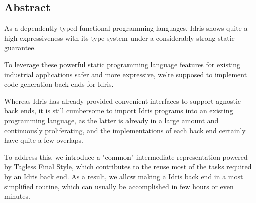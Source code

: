 \documentclass[a1,portrait]{a1poster}
\begin{document}
\begin{multicols}{2} %



\color{CornflowerBlue} %

\section*{Abstract}

As a dependently-typed functional programming languages, Idris shows
quite a high expressiveness with its type system under a considerably strong static guarantee.

To leverage these powerful static programming language features for
existing industrial applications safer and more expressive,
we're supposed to implement code generation back ends for Idris.

Whereas Idris has already provided convenient interfaces to support
agnostic back ends, it is still cumbersome to import Idris programs
into an existing programming language, as the latter is already
in a large amount and continuously proliferating, and the implementations
of each back end certainly have quite a few overlaps.
  
To address this, we introduce a "common" intermediate representation
powered by Tagless Final Style, which contributes to the reuse most of the tasks
required by an Idris back end. As a result, we allow making a Idris back end
in a most simplified routine, which can usually be accomplished in few hours
or even minutes.




\end{multicols}
\end{document}
